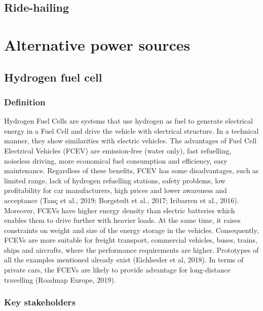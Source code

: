 \documentclass[
]{book}
\begin{document}
\hypertarget{ride-hailing}{%
\section{Ride-hailing}\label{ride-hailing}}

\hypertarget{alternative}{%
\chapter{Alternative power sources}\label{alternative}}

\hypertarget{hydrogen-fuel-cell}{%
\section{Hydrogen fuel cell}\label{hydrogen-fuel-cell}}

\hypertarget{definition-13}{%
\subsection*{Definition}\label{definition-13}}

Hydrogen Fuel Cells are systems that use hydrogen as fuel to generate electrical energy in a Fuel Cell and drive the vehicle with electrical structure. In a technical manner, they show similarities with electric vehicles. The advantages of Fuel Cell Electrical Vehicles (FCEV) are emission-free (water only), fast refuelling, noiseless driving, more economical fuel consumption and efficiency, easy maintenance. Regardless of these benefits, FCEV has some disadvantages, such as limited range, lack of hydrogen refuelling stations, safety problems, low profitability for car manufacturers, high prices and lower awareness and acceptance (Tanç et al., 2019; Borgstedt et al., 2017; Iribarren et al., 2016). Moreover, FCEVs have higher energy density than electric batteries which enables them to drive further with heavier loads. At the same time, it raises constraints on weight and size of the energy storage in the vehicles. Consequently, FCEVs are more suitable for freight transport, commercial vehicles, buses, trains, ships and aircrafts, where the performance requirements are higher. Prototypes of all the examples mentioned already exist (Eichlseder et al, 2018). In terms of private cars, the FCEVs are likely to provide advantage for long-distance travelling (Roadmap Europe, 2019).

\hypertarget{key-stakeholders-13}{%
\subsection*{Key stakeholders}\label{key-stakeholders-13}}
\end{document}
